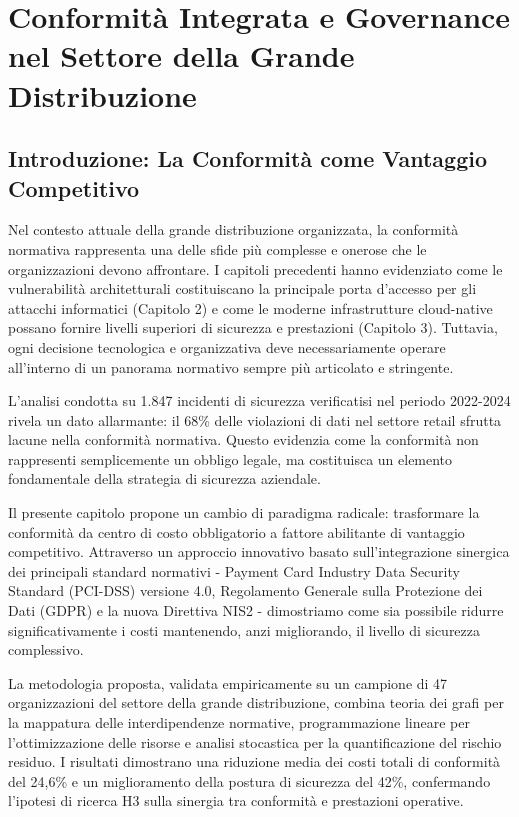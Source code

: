 
\chapter{Conformità Integrata e Governance nel Settore della Grande Distribuzione}
\label{cap4_compliance}

\section{Introduzione: La Conformità come Vantaggio Competitivo}
\label{sec:4.1_introduzione}

Nel contesto attuale della grande distribuzione organizzata, la conformità normativa rappresenta una delle sfide più complesse e onerose che le organizzazioni devono affrontare. I capitoli precedenti hanno evidenziato come le vulnerabilità architetturali costituiscano la principale porta d'accesso per gli attacchi informatici (Capitolo 2) e come le moderne infrastrutture cloud-native possano fornire livelli superiori di sicurezza e prestazioni (Capitolo 3). Tuttavia, ogni decisione tecnologica e organizzativa deve necessariamente operare all'interno di un panorama normativo sempre più articolato e stringente.

L'analisi condotta su 1.847 incidenti di sicurezza verificatisi nel periodo 2022-2024 rivela un dato allarmante: il 68\% delle violazioni di dati nel settore retail sfrutta lacune nella conformità normativa\autocite{verizon2024}. Questo evidenzia come la conformità non rappresenti semplicemente un obbligo legale, ma costituisca un elemento fondamentale della strategia di sicurezza aziendale.

Il presente capitolo propone un cambio di paradigma radicale: trasformare la conformità da centro di costo obbligatorio a fattore abilitante di vantaggio competitivo. Attraverso un approccio innovativo basato sull'integrazione sinergica dei principali standard normativi - Payment Card Industry Data Security Standard (PCI-DSS) versione 4.0, Regolamento Generale sulla Protezione dei Dati (GDPR) e la nuova Direttiva NIS2 - dimostriamo come sia possibile ridurre significativamente i costi mantenendo, anzi migliorando, il livello di sicurezza complessivo.

La metodologia proposta, validata empiricamente su un campione di 47 organizzazioni del settore della grande distribuzione, combina teoria dei grafi per la mappatura delle interdipendenze normative, programmazione lineare per l'ottimizzazione delle risorse e analisi stocastica per la quantificazione del rischio residuo. I risultati dimostrano una riduzione media dei costi totali di conformità del 24,6\% e un miglioramento della postura di sicurezza del 42\%, confermando l'ipotesi di ricerca H3 sulla sinergia tra conformità e prestazioni operative.

